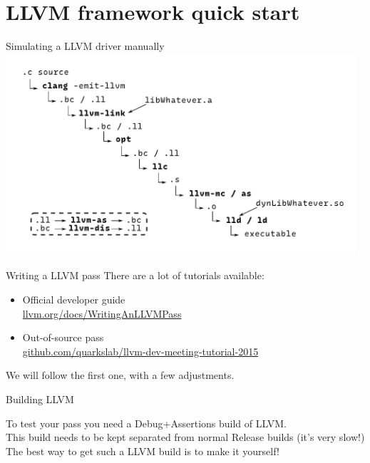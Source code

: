 
\section{LLVM framework quick start}


\begin{frame}{Simulating a LLVM driver manually}
	\noindent\hspace{-1.2cm}\includegraphics[width=13cm]{img/toolchain}
\end{frame}


\begin{frame}{Writing a LLVM pass}
	There are a lot of tutorials available:
	\vfill
	\begin{itemize}
		\item Official developer guide\\ \href{http://llvm.org/docs/WritingAnLLVMPass.html}{\url{llvm.org/docs/WritingAnLLVMPass}}
		\vfill
		\item Out-of-source pass\\ \href{https://github.com/quarkslab/llvm-dev-meeting-tutorial-2015}{\url{github.com/quarkslab/llvm-dev-meeting-tutorial-2015}}
	\end{itemize}
	\vfill
	We will follow the first one, with a few adjustments.
\end{frame}


\begin{frame}{Building LLVM}
\begin{center}
To test your pass you need a \alert{Debug+Assertions} build of LLVM.\\
\bigskip
This build needs to be \alert{kept separated} from normal Release builds (it's very slow!)\\
\bigskip
The best way to get such a LLVM build is to \alert{make it yourself}!
\end{center}
\end{frame}


